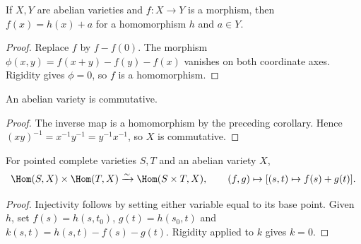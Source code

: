 \begin{corollary}
\label{mumford-cor-morphism-translation}
If $X,Y$ are abelian varieties and $f:X\to Y$ is a morphism, then
$f(x)=h(x)+a$ for a homomorphism $h$ and $a\in Y$.
\leanok
{}
\end{corollary}
\begin{proof}
Replace $f$ by $f-f(0)$. The morphism
$\phi(x,y)=f(x+y)-f(y)-f(x)$ vanishes on both coordinate axes. Rigidity gives
$\phi=0$, so $f$ is a homomorphism.
\end{proof}

\begin{corollary}
\label{mumford-cor-abelian-commutative}
An abelian variety is commutative.
\leanok
{}
\end{corollary}
\begin{proof}
The inverse map is a homomorphism by the preceding corollary. Hence
$(xy)^{-1}=x^{-1}y^{-1}=y^{-1}x^{-1}$, so $X$ is commutative.
\end{proof}

\begin{corollary}
\label{mumford-cor-pointed-hom-linear}
For pointed complete varieties $S,T$ and an abelian variety $X$,
\[
 \Hom(S,X)\times\Hom(T,X)\xrightarrow{\sim}\Hom(S\times T,X),
 \qquad(f,g)\mapsto[(s,t)\mapsto f(s)+g(t)].
\]
\leanok
{}
\end{corollary}
\begin{proof}
Injectivity follows by setting either variable equal to its base point. Given
$h$, set $f(s)=h(s,t_0)$, $g(t)=h(s_0,t)$ and
$k(s,t)=h(s,t)-f(s)-g(t)$. Rigidity applied to $k$ gives $k=0$.
\end{proof}


